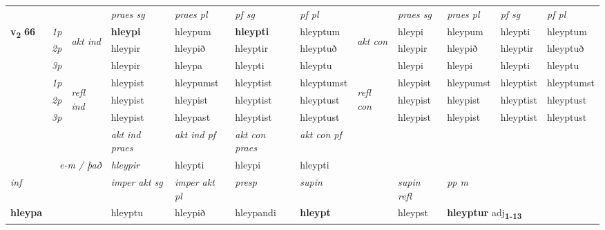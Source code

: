 \begin{longtable}[l]{X>{\footnotesize\itshape}llXXXXlXXXX}
\midrule

 & &   & \textit{praes sg}  & \textit{praes pl}    & \textit{ pf sg} & \textit{pf pl} & & \textit{praes sg}  & \textit{praes pl}    & \textit{pf sg} & \textit{pf pl }  \\ \cmidrule{4-7} \cmidrule{9-12}
 \multirow{2}{*}{{{\textbf{v{\textsubscript{2}}} \Large{\textbf{66}}}}}  & 1p & \multirow{3}{*}{\begin{turn}{90}\textit{akt ind}\end{turn}} & \textbf{hleypi} & hleypum & \textbf{hleypti} & hleyptum & \multirow{3}{*}{\begin{turn}{90}\textit{akt con}\end{turn}} &hleypi & hleypum & hleypti & hleyptum\\*
 & 2p &  &  hleypir  & hleypið & hleyptir & hleyptuð & & hleypir & hleypið & hleyptir & hleyptuð \\*
 & 3p &  & hleypir & hleypa & hleypti & hleyptu & & hleypi & hleypi& hleypti & hleyptu \\*
\cmidrule{4-7} \cmidrule{9-12}
 & 1p & \multirow{3}{*}{\begin{turn}{90}\textit{refl ind}\end{turn}}  & hleypist & hleypumst & hleyptist & hleyptumst & \multirow{3}{*}{\begin{turn}{90}\textit{refl con}\end{turn}}  &hleypist & hleypumst & hleyptist & hleyptumst \\*
 & 2p &  & hleypist & hleypist & hleyptist & hleyptust & &hleypist & hleypist & hleyptist & hleyptust \\*
 & 3p  & & hleypist & hleypast & hleyptist & hleyptust & & hleypist & hleypist& hleyptist & hleyptust \\*
\cmidrule{4-7} \cmidrule{9-12}

   && &  \textit{akt ind praes} & \textit{akt ind pf} & \textit{akt con praes} & \textit{akt con pf} \\*
\multicolumn{3}{r}{\textit{e-m / það}} & hleypir & hleypti & hleypi & hleypti \\*

\cmidrule{4-7}
   {\textit{inf}} & &  & \textit{imper akt sg} & \textit{imper akt pl}   & \textit{presp} & \textit{supin} && \textit{supin refl} & \textit{pp m} \\*
  {\textbf{hleypa}} & && hleyptu  & hleypið   & hleypandi &  \textbf{hleypt} && hleypst & \multicolumn{2}{l}{\textbf{hleyptur} adj\textbf{\textsubscript{1-13}}} \\*


\end{longtable}
